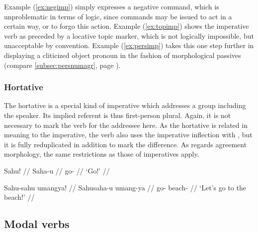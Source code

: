 Example (\ref{ex:negimp}) simply expresses a negative command, which is 
unproblematic in terms of logic, since commands may be issued to act in a 
certain way, or to forgo this action. Example (\ref{ex:topimp}) shows the 
imperative verb as preceded by a locative topic marker, which is not logically 
impossible, but unacceptable by convention. Example (\ref{ex:persimp}) takes 
this one step further in displaying a cliticized object pronoun in the fashion 
of morphological passives (compare \autoref{subsec:persnumagr}, page 
\pageref{patagr}).


\subsubsection{Hortative}

The hortative is a special kind of imperative which addresses a group 
including the speaker. Its implied referent is thus first-person plural. 
Again, it is not necessary to mark the verb for the addressee here. As 
the hortative is related in meaning to the imperative, the verb also uses the 
imperative inflection with , but it is fully reduplicated in 
addition to mark the difference. As regards agreement morphology, the same 
restrictions as those of imperatives apply.

\pex
\a\begingl
	\gla Sahu! //
	\glb Saha-u //
	\glc go-\Imp{} //
	\glft `Go!' //
\endgl

\a\begingl
	\gla Sahu-sahu umangya! //
	\glb Sahu\til{}saha-u umang-ya //
	\glc \Hort{}\til{}go-\Imp{} beach-\Loc{} //
	\glft `Let's go to the beach!' //
\endgl
\xe



\subsection{Modal verbs}
\label{subsec:modals}

